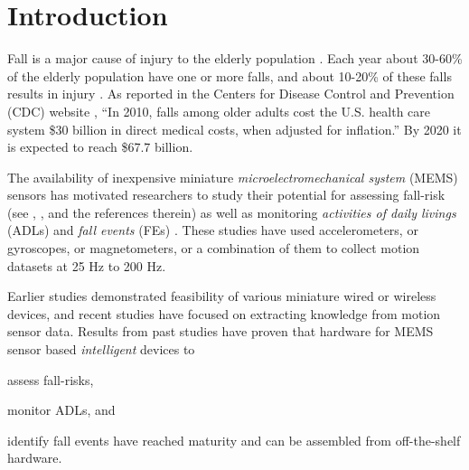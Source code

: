 \documentclass[]{IEEEtran}
\begin{document}
\section{Introduction}
\label{sec:Intro}
Fall is a major cause of injury to the elderly population \cite{Rubenstein2006}. 
Each year about 30-60\% of the elderly population have one or more falls, and  about 10-20\% of these falls results in injury \cite{Rubenstein2006}. 
As reported in the Centers for Disease Control and Prevention (CDC) website 
\cite{CDC2014July},
``In 2010, falls among older adults cost the U.S. health care system \$30 billion in direct medical costs, when adjusted for inflation.'' By 2020 it is expected to reach \$67.7 billion. 
\par 
The availability of inexpensive miniature \emph{microelectromechanical system} (MEMS) sensors  has motivated researchers  to study their potential for assessing fall-risk  (see \cite{shanyReview2012}, \cite{howcroftReview2013}, and the references therein) as well as monitoring \emph{activities of daily livings} (ADLs) \cite{alvarezActivityAndFallRecognotion2015,BaoActivityrecognition2004,DernbachActivityAndFallDetectionPhone2012,krishnanActivityRecognition2014,kumarActivitAndFallDetection2013} and \emph{fall events} (FEs) \cite{baekFallDetection2013,baiFallDetectionPhone2013,DernbachActivityAndFallDetectionPhone2012,dumitracheFallDetection2013,kumarActivitAndFallDetection2013,leoneFallDetection2013,liangFallDetection2012,liFallDetection2009,moyaFallAndDamageDetection2015,ojetolaFallDetection2011,ShenFallDetectionPhone2015,steidlFallDetection2012,DoukasFallDetection2011,ErdoganFallDetection2014,JianFallDetection2015}. These studies have used  accelerometers,  or gyroscopes, or magnetometers, or  a combination of them to collect motion datasets at  25 Hz to 200 Hz.  
\par
Earlier studies demonstrated feasibility of various miniature wired or wireless devices, and recent studies have focused on extracting knowledge from motion sensor data.  Results from past studies have proven  that hardware for MEMS sensor based \emph{intelligent} devices to \begin{inparaenum} [($i$)] \item assess fall-risks, \item monitor ADLs, and \item identify fall events have reached maturity and can be assembled from off-the-shelf hardware. \end{inparaenum}  
\end{document}

